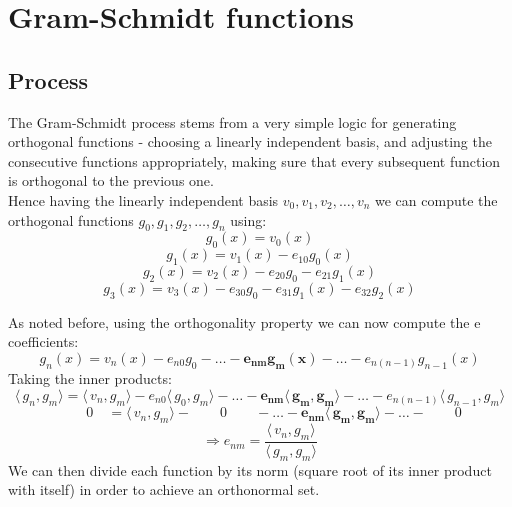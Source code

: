 \documentclass[a4paper, fleqn]{article}
\numberwithin{equation}{section}
\begin{document}
\section{Gram-Schmidt functions}

\subsection{Process}

The Gram-Schmidt process stems from a very simple logic for generating orthogonal functions - choosing a linearly independent basis, and adjusting the consecutive functions appropriately, making sure that every subsequent function is orthogonal to the previous one.
\\
Hence having the linearly independent basis $v_0, v_1, v_2, \ldots, v_n$ we can compute the orthogonal functions $g_0, g_1, g_2, \ldots, g_n$ using:
\begin{equation} g_0(x) = v_0(x) \end{equation}
\begin{equation} g_1(x) = v_1(x) - e_{10} g_0 (x) \end{equation}
\begin{equation} g_2(x) = v_2(x) - e_{20} g_0 - e_{21} g_1 (x) \end{equation}
\begin{equation} g_3(x) = v_3(x) - e_{30} g_0 - e_{31} g_1 (x) - e_{32} g_2 (x)\end{equation}

\noindent As noted before, using the orthogonality property we can now compute the e coefficients:
\begin{equation} g_n(x) = v_n(x) - e_{n0} g_0 - \ldots - \boldsymbol{e_{nm} g_m (x)} - \ldots - e_{n(n-1)} g_{n-1} (x) \end{equation}
Taking the inner products:
\begin{equation} \langle\,g_n,g_m\rangle = \langle\,v_n,g_m\rangle - e_{n0} \langle\,g_0,g_m\rangle - \ldots - \boldsymbol{e_{nm} \langle\,g_m,g_m\rangle} - \ldots - e_{n(n-1)} \langle\,g_{n-1},g_m\rangle \end{equation}
\begin{equation} \quad \quad 0 \quad = \langle\,v_n,g_m\rangle - \quad \quad 0 \quad \quad - \ldots - \boldsymbol{e_{nm} \langle\,g_m,g_m\rangle} - \ldots - \quad \quad 0 \end{equation}
\begin{equation} \Rightarrow e_{nm} = \frac{\langle\,v_n,g_m\rangle}{\langle\,g_m,g_m\rangle} \end{equation}
We can then divide each function by its norm (square root of its inner product with itself) in order to achieve an orthonormal set.
\end{document}
